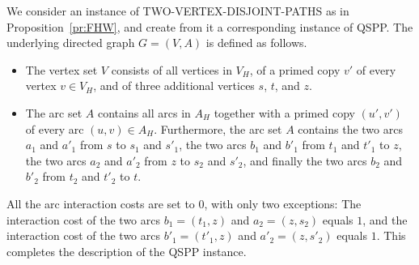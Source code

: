 We consider an instance of TWO-VERTEX-DISJOINT-PATHS as in Proposition~\ref{pr:FHW},
and create from it a corresponding instance of QSPP.
The underlying directed graph $G=(V,A)$ is defined as follows.
\begin{itemize}
\item The vertex set $V$ consists of all vertices in $V_H$, of a primed copy $v'$ of every
vertex $v\in V_H$, and of three additional vertices $s$, $t$, and $z$.
\item The arc set $A$ contains all arcs in $A_H$ together with a primed copy $(u',v')$
of every arc $(u,v)\in A_H$.
Furthermore, the arc set $A$ contains
the two arcs $a_1$ and $a'_1$ from $s$ to $s_1$ and $s'_1$,
the two arcs $b_1$ and $b'_1$ from $t_1$ and $t'_1$ to $z$,
the two arcs $a_2$ and $a'_2$ from $z$ to $s_2$ and $s'_2$, and finally
the two arcs $b_2$ and $b'_2$ from $t_2$ and $t'_2$ to $t$.
\end{itemize}
All the arc interaction costs are set to $0$, with only two exceptions:
The interaction cost of the two arcs $b_1=(t_1,z)$ and $a_2=(z,s_2)$ equals $1$, and
the interaction cost of the two arcs $b'_1=(t'_1,z)$ and $a'_2=(z,s'_2)$ equals $1$.
This completes the description of the QSPP instance.

